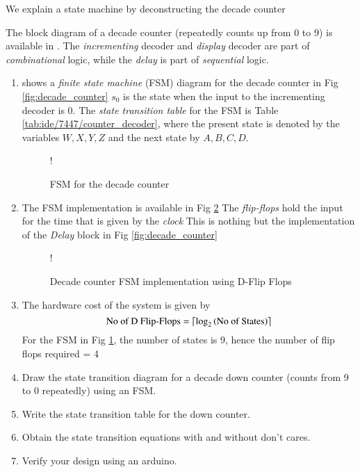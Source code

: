 We explain  a state machine by deconstructing the decade counter

The block diagram of a decade counter (repeatedly counts up from 0 to 9)
is available in .  The {\em incrementing } decoder
and {\em display} decoder are part of {\em combinational} logic, while
the {\em delay} is part of {\em sequential} logic.
%
%
\begin{enumerate}[label=\arabic*.,ref=\theenumi]
%
\item {} shows a {\em finite state machine} (FSM) diagram for the decade counter in Fig \ref{fig:decade_counter}  $s_0$ is the state when the input to the incrementing decoder is 0.  The {\em state transition table} for the FSM is Table \ref{tab:ide/7447/counter_decoder},
		where the present state is denoted by the variables $W,X,Y,Z$ and the next state by $A,B,C,D$.  
\begin{figure}[H]
\centering
\resizebox {\columnwidth} {!} {

}
\caption{FSM for the decade counter}
\label{fig:fsm_counter}
\end{figure}
\item The FSM implementation is available in Fig \ref{fig:dff}  The {\em flip-flops} hold the input for the time that is given by the {\em clock}  This is nothing but the implementation of the {\em Delay} block in Fig \ref{fig:decade_counter}
%
\begin{figure}[H]
\resizebox {\columnwidth} {!} {

}
\caption{Decade counter FSM implementation using D-Flip Flops}
\label{fig:dff}
\end{figure}
%
\item The hardware cost of the system is given by
\begin{equation}
\text{No of D Flip-Flops} = \left \lceil \log_{2}\left(\text{No of States}\right) \right \rceil
\end{equation}
For the FSM in Fig \ref{fig:fsm_counter}, the number of states is 9, hence the number of flip flops required = 4  
\item Draw the state transition diagram for 
a decade down counter (counts from 9 to 0 repeatedly) using an FSM.  
\item Write the state transition table for the down counter.
\item Obtain the state transition equations with and without don't cares.
\item Verify your design using an arduino.
\end{enumerate}


